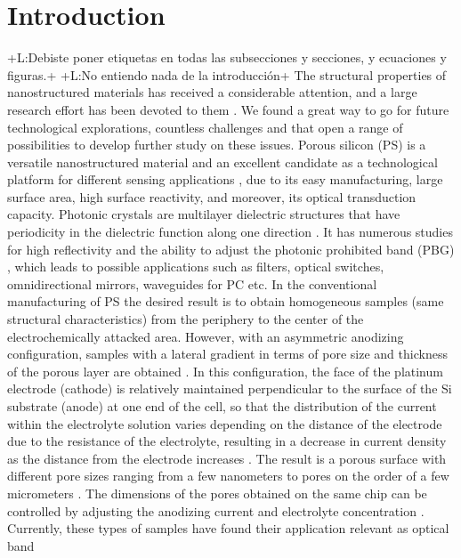 \documentclass{article}
\newcommand{\notaL}[1]{{\color{blue}+L:#1+}}
\begin{document}
\section{Introduction}
\label{sec:introduction}
\notaL{Debiste poner etiquetas en todas las subsecciones y secciones, y
  ecuaciones y figuras.}
\notaL{No entiendo nada de la introducción}
The structural properties of nanostructured materials  has  received a
considerable attention,  and a large research effort has been devoted
to them \cite{I1}. We found a great way to go for future
technological  explorations,  countless  challenges and  that  open a
range of possibilities to develop further  study  on these
issues\cite{I2}. Porous silicon (PS) is a versatile nanostructured
material and an excellent candidate as a technological platform for
different sensing applications \cite{I3, I4}, due to its easy
manufacturing,  large surface area, high surface reactivity,  and
moreover, its optical transduction capacity.  Photonic crystals are
multilayer dielectric structures that have periodicity in the
dielectric function along one direction \cite{I5}. It has numerous
studies for high reflectivity and the ability to adjust  the photonic
prohibited  band (PBG)\cite{I6} , which leads to possible applications
such as filters\cite{I7}, optical switches\cite{I8}, omnidirectional
mirrors\cite{I9}, waveguides for PC \cite{I10} etc. In the
conventional manufacturing of PS the desired result  is to obtain
homogeneous samples (same structural characteristics) from the
periphery  to the center  of the electrochemically  attacked area.
However, with an asymmetric anodizing configuration,  samples with a
lateral gradient in terms of pore size and thickness of the porous
layer are obtained \cite{I101}. In this configuration,  the face of
the platinum  electrode (cathode)  is relatively maintained
perpendicular  to the surface of the Si substrate (anode) at one end
of the cell, so that the distribution of the current within the
electrolyte  solution varies depending on the distance  of the
electrode due to the resistance of the electrolyte,  resulting  in a
decrease in current density as the distance from the electrode
increases \cite{I102, I103}. The result is a porous surface with
different pore sizes ranging from a few nanometers  to pores on the
order of a few micrometers  \cite{I104}. The dimensions of the pores
obtained on the same chip can be controlled by adjusting the anodizing
current and electrolyte concentration \cite{I11}. Currently, these
types of samples have found their application relevant as optical band
\end{document}
